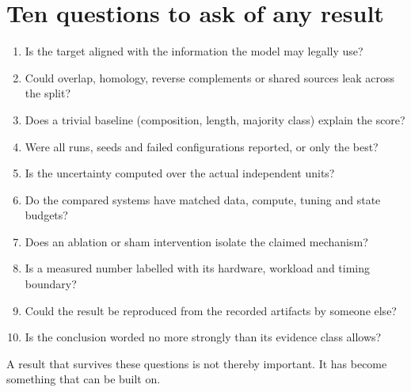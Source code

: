\section{Ten questions to ask of any result}
\begin{enumerate}
\setlength{\itemsep}{1pt}
\item Is the target aligned with the information the model may legally use?
\item Could overlap, homology, reverse complements or shared sources leak across the split?
\item Does a trivial baseline (composition, length, majority class) explain the score?
\item Were all runs, seeds and failed configurations reported, or only the best?
\item Is the uncertainty computed over the actual independent units?
\item Do the compared systems have matched data, compute, tuning and state budgets?
\item Does an ablation or sham intervention isolate the claimed mechanism?
\item Is a measured number labelled with its hardware, workload and timing boundary?
\item Could the result be reproduced from the recorded artifacts by someone else?
\item Is the conclusion worded no more strongly than its evidence class allows?
\end{enumerate}
A result that survives these questions is not thereby important. It has become
something that can be built on.
